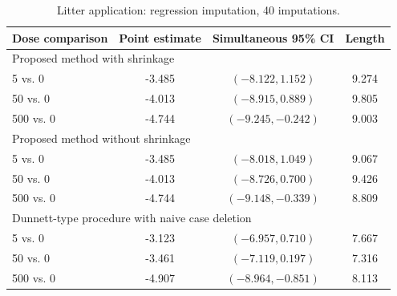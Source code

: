 \begin{table}[htbp]
\centering
\caption{Litter application: regression imputation, 40 imputations.}
\begin{tabular}{lccc}
\hline
Dose comparison & Point estimate & Simultaneous 95\% CI & Length \\
\hline
\multicolumn{4}{l}{Proposed method with shrinkage} \\
5 vs. 0 & -3.485 & $(-8.122, 1.152)$ & 9.274 \\
50 vs. 0 & -4.013 & $(-8.915, 0.889)$ & 9.805 \\
500 vs. 0 & -4.744 & $(-9.245, -0.242)$ & 9.003 \\
\multicolumn{4}{l}{Proposed method without shrinkage} \\
5 vs. 0 & -3.485 & $(-8.018, 1.049)$ & 9.067 \\
50 vs. 0 & -4.013 & $(-8.726, 0.700)$ & 9.426 \\
500 vs. 0 & -4.744 & $(-9.148, -0.339)$ & 8.809 \\
\multicolumn{4}{l}{Dunnett-type procedure with naive case deletion} \\
5 vs. 0 & -3.123 & $(-6.957, 0.710)$ & 7.667 \\
50 vs. 0 & -3.461 & $(-7.119, 0.197)$ & 7.316 \\
500 vs. 0 & -4.907 & $(-8.964, -0.851)$ & 8.113 \\
\hline
\end{tabular}
\end{table}
